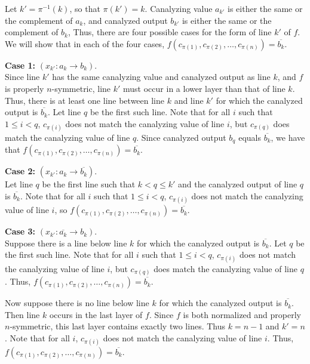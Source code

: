 Let $k' = \pi^{-1}(k)$, so that $\pi(k') = k$.  Canalyzing value
$a_{k'}$ is either the same or the complement of $a_k$, and canalyzed
output $b_{k'}$ is either the same or the complement of $b_k$, Thus,
there are four possible cases for the form of line $k'$ of $f$.  We
will show that in each of the four cases, $f(c_{\pi(1)}, c_{\pi(2)},
\ldots, c_{\pi(n)}) = \overline{b_k}$.

\noindent
{\bf Case 1:} $(x_{k'} : a_k \rightarrow b_k)$. \\ 

Since line $k'$
has the same canalyzing value and canalyzed output as line $k$, and
$f$ is properly $n$-symmetric, line $k'$ must occur in a lower layer
than that of line $k$.  Thus, there is at least one line between
line $k$ and line $k'$ for which the canalyzed output is $\overline{b_k}$.
Let line $q$ be the first such line.  Note that for all $i$ such
that $1 \leq i < q$, $c_{\pi(i)}$ does not match the canalyzing
value of line $i$, but $c_{\pi(q)}$ does match the canalyzing value
of line $q$.  Since canalyzed output $b_q$ equals $\overline{b_k}$,
we have that $f(c_{\pi(1)}, c_{\pi(2)}, \ldots, c_{\pi(n)}) =
\overline{b_k}$.

\noindent
{\bf Case 2:} $(x_{k'} : a_k \rightarrow \overline{b_k})$. \\

Let line $q$ be the first line such that $k < q \leq k'$ and
the canalyzed output of line $q$ is $\overline{b_k}$.
Note that for all $i$ such that $1 \leq i < q$, 
$c_{\pi(i)}$ does not match the canalyzing value of line $i$,
so $f(c_{\pi(1)}, c_{\pi(2)}, \ldots, c_{\pi(n)}) = \overline{b_k}$.

\noindent
{\bf Case 3:} $(x_{k'} : \overline{a_k} \rightarrow b_k)$. \\

Suppose there is a line below line $k$ for which the canalyzed
output is $\overline{b_k}$.  Let $q$ be the first such line.  Note
that for all $i$ such that $1 \leq i < q$, $c_{\pi(i)}$ does not
match the canalyzing value of line $i$, but $c_{\pi(q)}$ does match
the canalyzing value of line $q$.  Thus, $f(c_{\pi(1)}, c_{\pi(2)},
\ldots, c_{\pi(n)}) = \overline{b_k}$.

Now suppose there is no line below line $k$ for which the canalyzed
output is $\overline{b_k}$.  Then line $k$ occurs in the last layer
of $f$.  Since $f$ is both normalized and properly $n$-symmetric,
this last layer contains exactly two lines.  Thus $k = n-1$ and $k'
= n$.  Note that for all $i$, $c_{\pi(i)}$ does not match the
canalyzing value of line $i$.  Thus, $f(c_{\pi(1)}, c_{\pi(2)},
\ldots, c_{\pi(n)}) = \overline{b_k}$.

